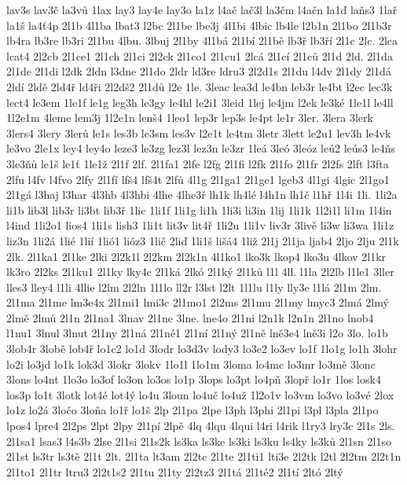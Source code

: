 {lav3s
lav3č
la3vů
1lax
lay3
lay4e
lay3o
la1z
l4ač
lač3l
la3čm
l4ačn
la1ď
laňs3
1lař
la1š
la4ť4p
2l1b
4l1ba
lbat3
l2bc
2l1be
lbe3j
4l1bi
4lbic
lb4le
l2b1n
2l1bo
2l1b3r
lb4ra
lb3re
lb3ri
2l1bu
4lbu.
3lbuj
2l1by
4l1bá
2l1bí
2l1bě
lb3ř
lb3ří
2l1c
2lc.
2lca
lcat4
2l2cb
2l1ce1
2l1ch
2l1ci
2l2ck
2l1co1
2l1cu1
2lcá
2l1cí
2l1ců
2l1d
2ld.
2l1da
2l1de
2l1di
l2dk
2ldn
l3dne
2l1do
2ldr
ld3re
ldru3
2l2d1s
2l1du
l4dv
2l1dy
2l1dá
2ldí
2ldě
2ld4ř
ld4ři
2l2dš2
2l1dů
l2e
1le.
3leac
lea3d
le4bn
leb3r
le4bt
l2ec
lec3k
lect4
le3em
1le1f
le1g
leg3h
le3gy
le4hl
le2i1
3leid
1lej
le4jm
l2ek
le3ké
1le1l
le4ll
1l2e1m
4leme
lem3j
1l2e1n
lenš4
1leo1
lep3r
lep3s
le4pt
le1r
3ler.
3lera
3lerk
3lers4
3lery
3lerů
le1s
les3b
le3sm
les3v
l2e1t
le4tm
3letr
3lett
le2u1
lev3h
le4vk
le3vo
2le1x
ley4
ley4o
leze3
le3zg
lez3l
lez3n
le3zr
1leá
3leó
3leóz
leú2
leús3
le4ňs
3le3ňů
le1š
le1ť
1le1ž
2l1f
2lf.
2l1fa1
2lfe
l2fg
2l1fi
l2fk
2l1fo
2l1fr
2l2fs
2lft
l3fta
2lfu
l4fv
l4fvo
2lfy
2l1fí
lfš4
lfš4t
2lfů
4l1g
2l1ga1
2l1ge1
lgeb3
4l1gi
4lgic
2l1go1
2l1gá
l3haj
l3har
4l3hb
4l3hbi
4lhe
4lhe3ř
lh1k
lh4lé
l4h1n
lh1č
l1hř
1l4i
1li.
1li2a
li1b
lib3l
lib3r
li3bt
lib3ř
1lic
1li1f
1li1g
li1h
1li3i
li3in
1lij
1li1k
1l2i1l
li1m
1l4in
l4ind
1li2o1
lios4
1li1s
lish3
1li1t
lit3v
lit4ř
1li2u
1li1v
liv3r
3livě
li3w
li3wa
1li1z
liz3n
1li2á
1lié
1lií
1lió1
lióz3
1lič
2liď
1li1š
lišá4
1liž
2l1j
2l1ja
ljab4
2ljo
2lju
2l1k
2lk.
2l1ka1
2l1ke
2lki
2l2k1l
2l2km
2l2k1n
4l1ko1
lko3k
lkop4
lko3u
4lkov
2l1kr
lk3ro
2l2ks
2l1ku1
2l1ky
lky4c
2l1ká
2lkó
2l1ký
2l1ků
l1l
4ll.
l1la
2l2lb
l1le1
3ller
lles3
lley4
l1li
4llie
l2lm
2l2ln
1l1lo
ll2r
l3lst
l2lt
1l1lu
l1ly
lly3e
l1lá
2l1m
2lm.
2l1ma
2l1me
lm3e4x
2l1mi1
lmi3c
2l1mo1
2l2ms
2l1mu
2l1my
lmyc3
2lmá
2lmý
2lmě
2lmů
2l1n
2l1na1
3lnav
2l1ne
3lne.
lne4o
2l1ni
l2n1k
l2n1n
2l1no
lnob4
l1nu1
3lnul
3lnut
2l1ny
2l1ná
2l1né1
2l1ní
2l1ný
2l1ně
lně3e4
lně3i
l2o
3lo.
lo1b
3lob4r
3lobě
lob4ř
lo1c2
lo1d
3lodr
lo3d3v
lody3
lo3e2
lo3ev
lo1f
1lo1g
lo1h
3lohr
lo2i
lo3jd
lo1k
lok3d
3lokr
3lokv
1lo1l
1lo1m
3loma
lo4mc
lo3mr
lo3mě
3lonc
3lons
lo4nt
1lo3o
lo3of
lo3on
lo3os
lo1p
3lops
lo3pt
lo4pň
3lopř
lo1r
1los
losk4
los3p
lo1t
3lotk
lot4é
lot4ý
lo4u
3loun
lo4uč
lo4už
1l2o1v
lo3vm
lo3vo
lo3vé
2lox
lo1z
lo2á
3ločo
3loňa
lo1ř
lo1š
2lp
2l1pa
2lpe
l3ph
l3phi
2l1pi
l3pl
l3pla
2l1po
lpos4
lpre4
2l2ps
2lpt
2lpy
2l1pí
2lpě
4lq
4lqu
4lqui
l4ri
l4rik
l1ry3
lry3c
2l1s
2ls.
2l1sa1
lsas3
l4s3b
2lse
2l1si
2l1s2k
ls3ka
ls3ke
ls3ki
ls3ku
ls4ky
ls3ků
2l1sn
2l1so
2l1st
ls3tr
ls3tě
2l1t
2lt.
2l1ta
lt3am
2l2tc
2l1te
2l1ti1
lti3e
2l2tk
l2tl
2l2tm
2l2t1n
2l1to1
2l1tr
ltru3
2l2t1s2
2l1tu
2l1ty
2l2tz3
2l1tá
2l1té2
2l1tí
2ltó
2ltý
}
